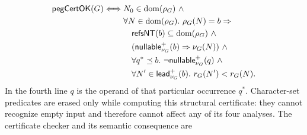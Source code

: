 \begin{equation}\label{eq:peg-admissibility-certificate}
\begin{split}
 \mathsf{pegCertOK}(G)\Longleftrightarrow{}&
 N_0\in\dom(\rho_G)\ \land\\
 &\forall N\in\dom(\rho_G).\ \rho_G(N)=b\Rightarrow\\
 &\quad \mathsf{refsNT}(b)\subseteq\dom(\rho_G)\ \land\\
 &\quad(\mathsf{nullable}^{+}_{\nu_G}(b)\Rightarrow\nu_G(N))\ \land\\
 &\quad\forall q^*\preceq b.\ \neg\mathsf{nullable}^{+}_{\nu_G}(q)\ \land\\
 &\quad\forall N'\in\mathsf{lead}^{+}_{\nu_G}(b).\
               r_G(N')<r_G(N).
\end{split}
\end{equation}
In the fourth line $q$ is the operand of that particular occurrence $q^*$.
Character-set
predicates are erased only while computing this structural certificate: they
cannot recognize empty input and therefore cannot affect any of its four
analyses.  The certificate checker and its semantic consequence are

